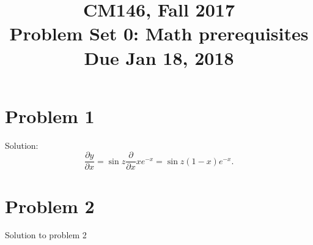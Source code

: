 \documentclass[11pt]{article}
\newcommand{\cnum}{CM146}
\newcommand{\ced}{Fall 2017}
\newcommand{\ctitle}[3]{\title{\vspace{-0.5in}\cnum, \ced\\Problem Set #1: #2\\Due #3}}
\newcommand{\solution}[1]{{{\color{blue}{\bf Solution:} {#1}}}}
\begin{document}
\ctitle{0}{Math prerequisites}{Jan 18, 2018}
\author{}
\date{}
\maketitle
\vspace{-0.75in}

\section{Problem 1}
Solution:
\begin{equation*}
\frac{\partial y}{\partial x}
= \sin z \frac{\partial}{\partial x} xe^{-x}
= \sin z (1 - x) e^{-x}.
\end{equation*}

\newpage
\section{Problem 2}

\solution{Solution to problem 2}
\newpage
\end{document}
